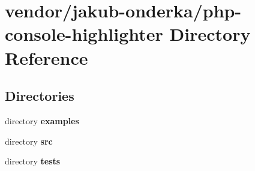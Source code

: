 \section{vendor/jakub-\/onderka/php-\/console-\/highlighter Directory Reference}
\label{dir_0c9730e042979ec0bc918766633086cb}
\subsection*{Directories}
\begin{DoxyCompactItemize}
\item 
directory {\bf examples}
\item 
directory {\bf src}
\item 
directory {\bf tests}
\end{DoxyCompactItemize}
